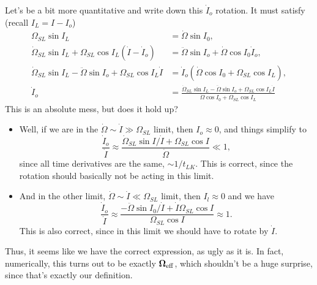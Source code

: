 \documentclass[11pt,
        usenames, %
        dvipsnames %
    ]{article}
\newcommand*{\bm}[1]{\boldsymbol{\mathbf{#1}}}
\newcommand*{\p}[1]{\left(#1\right)}
\begin{document}
Let's be a bit more quantitative and write down this $\dot{I}_o$ rotation. It
must satisfy (recall $I_L = I - I_o$)
\begin{align}
    \Omega_{SL}\sin I_L &= \dot{\Omega} \sin I_0,\\
    \dot{\Omega}_{SL}\sin I_L + \Omega_{SL}\cos I_L \p{\dot{I} - \dot{I}_o}
        &= \ddot{\Omega} \sin I_o + \dot{\Omega} \cos I_0 \dot{I}_o,\\
    \dot{\Omega}_{SL}\sin I_L - \ddot{\Omega} \sin I_o +
            \Omega_{SL}\cos I_L \dot{I}
        &= \dot{I}_o\p{\dot{\Omega} \cos I_0 + \Omega_{SL} \cos I_L},\\
    \dot{I}_o &= \frac{\dot{\Omega}_{SL}\sin I_L
            - \ddot{\Omega} \sin I_o
            + \Omega_{SL}\cos I_L \dot{I}}{
        \dot{\Omega} \cos I_0
            + \Omega_{SL} \cos I_L}
\end{align}
This is an absolute mess, but does it hold up?
\begin{itemize}
    \item Well, if we are in the $\dot{\Omega} \sim \dot{I} \gg \Omega_{SL}$
        limit, then $I_o \approx 0$, and things simplify to
        \begin{equation}
            \frac{\dot{I}_o}{\dot{I}} \approx
                \frac{\dot{\Omega}_{SL} \sin I / \dot{I} + \Omega_{SL}\cos I}
                {\dot{\Omega}} \ll 1,
        \end{equation}
        since all time derivatives are the same, $\sim 1/t_{LK}$. This is
        correct, since the rotation should basically not be acting in this
        limit.

    \item And in the other limit, $\dot{\Omega} \sim \dot{I} \ll
        \Omega_{SL}$ limit, then $I_l \approx 0$ and we have
        \begin{equation}
            \frac{\dot{I}_o}{\dot{I}} \approx
                \frac{-\ddot{\Omega}\sin I_0 / \dot{I}
                    + \dot{I} \Omega_{SL} \cos I}{
                        \Omega_{SL} \cos I}
                \approx 1.
        \end{equation}
        This is also correct, since in this limit we should have to rotate by
        $\dot{I}$.
\end{itemize}
Thus, it seems like we have the correct expression, as ugly as it is. In fact,
numerically, this turns out to be exactly $\bm{\Omega}_{\rm eff}$, which
shouldn't be a huge surprise, since that's exactly our definition.
\end{document}
